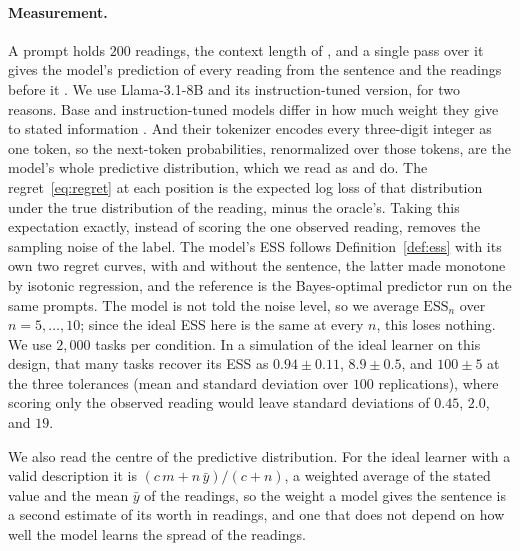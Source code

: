 \documentclass[10pt]{article}
\newcommand{\ess}{\mathrm{ESS}}
\begin{document}
\paragraph{Measurement.} A prompt holds $200$ readings, the context length of \citet{liu2025}, and a single pass over it gives the model's prediction of every reading from the sentence and the readings before it \citep{kossen2024}. We use Llama-3.1-8B and its instruction-tuned version, for two reasons. Base and instruction-tuned models differ in how much weight they give to stated information \citep{gupta2025}. And their tokenizer encodes every three-digit integer as one token, so the next-token probabilities, renormalized over those tokens, are the model's whole predictive distribution, which we read as \citet{liu2025} and \citet{requeima2024} do. The regret~\eqref{eq:regret} at each position is the expected log loss of that distribution under the true distribution of the reading, minus the oracle's. Taking this expectation exactly, instead of scoring the one observed reading, removes the sampling noise of the label. The model's ESS follows Definition~\ref{def:ess} with its own two regret curves, with and without the sentence, the latter made monotone by isotonic regression, and the reference is the Bayes-optimal predictor run on the same prompts. The model is not told the noise level, so we average $\ess_n$ over $n = 5, \dots, 10$; since the ideal ESS here is the same at every $n$, this loses nothing. We use $2{,}000$ tasks per condition. In a simulation of the ideal learner on this design, that many tasks recover its ESS as $0.94 \pm 0.11$, $8.9 \pm 0.5$, and $100 \pm 5$ at the three tolerances (mean and standard deviation over $100$ replications), where scoring only the observed reading would leave standard deviations of $0.45$, $2.0$, and $19$.

We also read the centre of the predictive distribution. For the ideal learner with a valid description it is $(c\,m + n\,\bar y)/(c + n)$, a weighted average of the stated value and the mean $\bar y$ of the readings, so the weight a model gives the sentence is a second estimate of its worth in readings, and one that does not depend on how well the model learns the spread of the readings.
\end{document}
